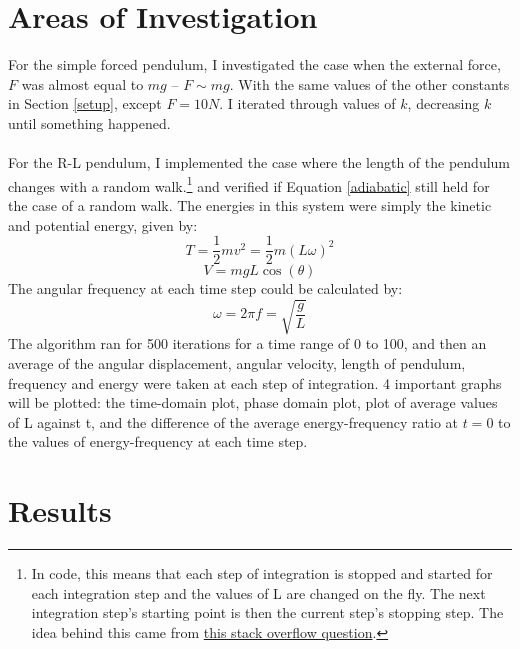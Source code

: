 \documentclass[10pt, twocolumn]{article}
\begin{document}
\section{Areas of Investigation}
For the simple forced pendulum, I investigated the case when the external force, $F$ was almost equal to $mg$ -- $F \sim{mg}$. With the same values of the other constants in Section \ref{setup}, except $F = 10N$. I iterated through values of $k$, decreasing $k$ until something happened.\\ 
\\
For the R-L pendulum, I implemented the case where the length of the pendulum changes with a random walk.\footnote{In code, this means that each step of integration is stopped and started for each integration step and the values of L are changed on the fly. The next integration step's starting point is then the current step's stopping step. The idea behind this came from \href{https://stackoverflow.com/questions/54767096/odeint-returns-wrong-results-for-an-ode-including-descrete-function}{this stack overflow question}.} and verified if Equation \eqref{adiabatic} still held for the case of a random walk. The energies in this system were simply the kinetic and potential energy, given by:
\begin{equation}
    T = \frac{1}{2}mv^2 = \frac{1}{2}m(L\omega)^2
\end{equation}
\begin{equation}
    V = mgL\cos(\theta) 
\end{equation}
The angular frequency at each time step could be calculated by:
\begin{equation}
    \omega = 2\pi{f} = \sqrt{\frac{g}{L}}
\end{equation}
The algorithm ran for 500 iterations for a time range of 0 to 100, and then an average of the angular displacement, angular velocity, length of pendulum, frequency and energy were taken at each step of integration. 4 important graphs will be plotted: the time-domain plot, phase domain plot, plot of average values of L against t, and the difference of the average energy-frequency ratio at $t = 0$ to the values of energy-frequency at each time step.
\section{Results}
\end{document}
